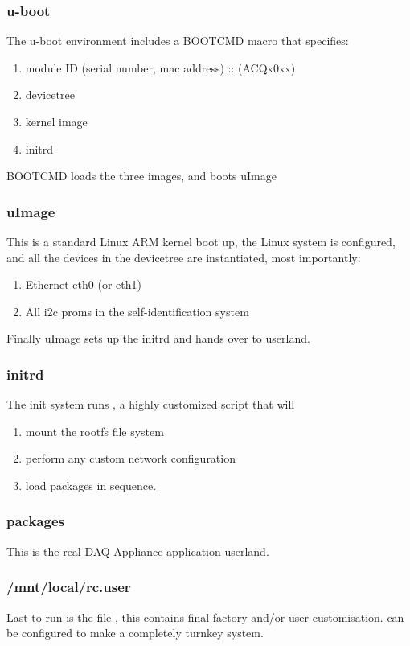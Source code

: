 \documentclass[]{article}
\begin{document}
\subsubsection{u-boot}
The u-boot environment includes a BOOTCMD macro that specifies:
\begin{enumerate}
    \item module ID (serial number, mac address) :: (ACQx0xx)
    \item devicetree
    \item kernel image
    \item initrd        
\end{enumerate}
BOOTCMD loads the three images, and boots uImage

\subsubsection{uImage}
This is a standard Linux ARM kernel boot up, the Linux system is configured, and all the devices in the devicetree are instantiated, most importantly:
\begin{enumerate}
    \item Ethernet eth0 (or eth1)
    \item All i2c proms in the self-identification system    
\end{enumerate}
Finally uImage sets up the initrd and hands over to userland.

\subsubsection{initrd}
The init system runs , a highly customized script that will
\begin{enumerate}
    \item mount the rootfs file system
    \item perform any custom network configuration
    \item load packages in sequence.
\end{enumerate}

\subsubsection{packages}
This is the real DAQ Appliance application userland. 

\subsubsection{/mnt/local/rc.user}
Last to run is the file , this contains final factory and/or user customisation.  can be configured to make a completely turnkey system.
\end{document}
